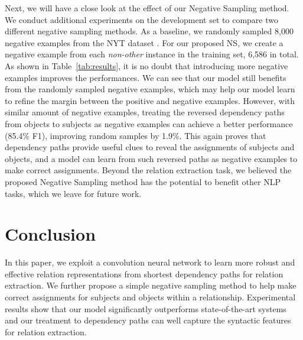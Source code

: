 \documentclass[11pt,a4paper]{article}
\begin{document}
Next, we will have a close look at the effect of our Negative Sampling method.
We conduct additional experiments on the development set to compare two different negative sampling methods. As a baseline, we randomly sampled 
8,000 negative examples from the NYT dataset \cite{DBLP:conf/acl/ChenFHQZ14}. 
For our proposed NS, we create a negative example from each \textit{non-other} instance in the training set, 6,586 in total. 
As shown in Table~\ref{tab:results}, it is no doubt that introducing more negative examples improves the performances.
 We can see that our model still benefits from the randomly sampled negative examples, which may help our model learn to refine the margin between the positive and negative examples. 
However, with similar amount of negative examples, treating the reversed dependency paths from objects to subjects as negative examples can achieve a better performance (85.4\% F1), improving random samples by 1.9\%. This again proves that dependency paths provide useful clues  to 
reveal the assignments of subjects and objects, and a model can learn  from such reversed paths as negative examples to make correct assignments.
Beyond the relation extraction task, we believed the proposed Negative Sampling method has the potential to benefit other NLP tasks, which we leave for future work.








\section{Conclusion}


In this paper, we exploit a convolution neural network to learn more robust and effective relation representations from shortest dependency paths 
for relation extraction. We further propose a simple  negative sampling method to help make correct assignments for subjects and objects within a relationship. 
Experimental results show that our model significantly outperforms state-of-the-art systems and our treatment to dependency paths
 can well capture the syntactic features for relation extraction. 






\end{document}
